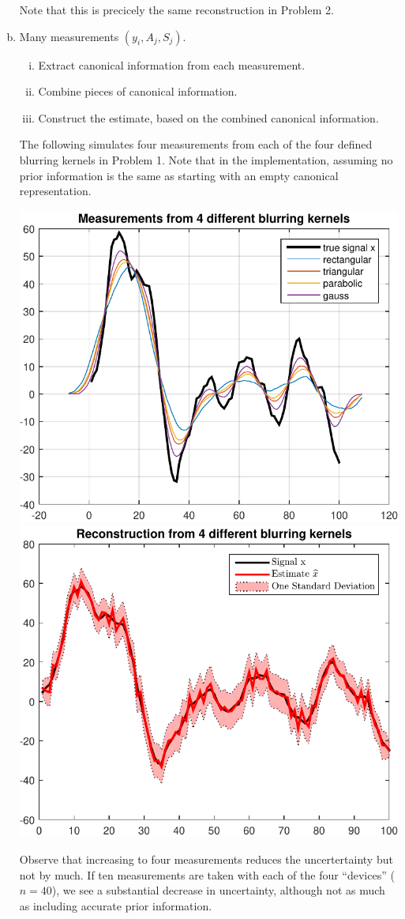 \documentclass{homework}
\begin{document}
\begin{enumerate}[(a)]
  Note that this is precicely the same reconstruction in Problem 2.

  \item Many measurements $(y_i,A_j,S_j)$.
  \begin{enumerate}[i.]
    \item Extract canonical information from each measurement.
    \item Combine pieces of canonical information.
    \item Construct the estimate, based on the combined canonical information.
  \end{enumerate}

  The following simulates four measurements from each of the four defined blurring kernels in Problem 1. Note that in the implementation, assuming no prior information is the same as starting with an empty canonical representation. 


\begin{center}\includegraphics[width=.45\textwidth]{problem3c1.pdf}\includegraphics[width=.45\textwidth]{problem3c2.pdf}\end{center}

Observe that increasing to four measurements reduces the uncertertainty but not by much. 
If ten measurements are taken with each of the four ``devices'' ($n=40$), we see a substantial decrease in uncertainty, although not as much as including accurate prior information.


\end{enumerate}
\end{document}
